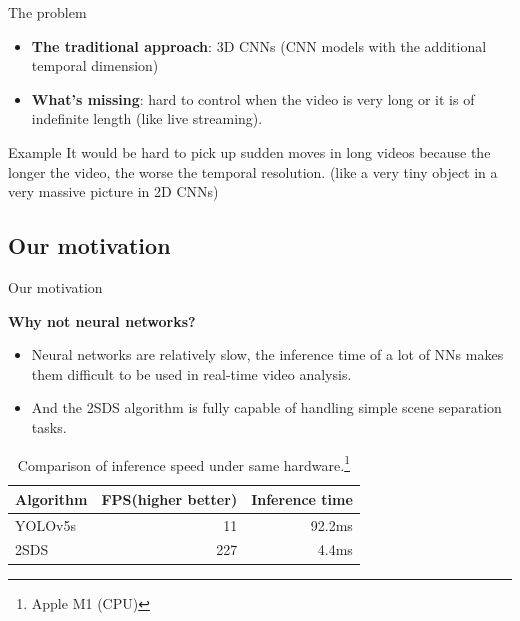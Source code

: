 \documentclass[aspectratio=43,display]{beamer}
\begin{document}
		\begin{frame}{The problem}

			\begin{itemize}
				\item \textbf{The traditional approach}: 3D CNNs (CNN models with the additional temporal dimension)
				\item \textbf{What's missing}: hard to control when the video is very long or it is of indefinite length (like live streaming).
			\end{itemize}

			\vskip 0.5cm

			\begin{block}{Example}
				It would be hard to pick up sudden moves in long videos because the longer the video, the worse the temporal resolution.
				(like a very tiny object in a very massive picture in 2D CNNs)
			\end{block}

		\end{frame}


	\subsection{Our motivation}

		\begin{frame}{Our motivation}

			\textbf{Why not neural networks?}

			\begin{itemize}
				\item Neural networks are relatively slow, the inference time of a lot of NNs makes them difficult to be used in real-time video analysis.
				\item And the 2SDS algorithm is fully capable of handling simple scene separation tasks.
			\end{itemize}

			\vskip 0.3cm

			\begin{table}
				\centering
				\begin{tabular}{l|r|r}
				Algorithm & FPS(higher better) & Inference time\\\hline
				YOLOv5s & 11 & 92.2ms \\
				2SDS & 227 & 4.4ms
				\end{tabular}
			\caption{\label{tab:widgets}Comparison of inference speed under same hardware.\footnote{Apple M1 (CPU)}}
			\end{table}


		\end{frame}
\end{document}
